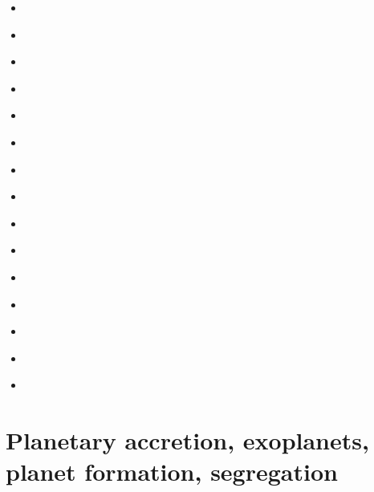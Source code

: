 \begin{scriptsize}
\begin{itemize}
\item[\nineteenninetyfive] 
\textcite{trry95}
\item[\nineteenninetynine] 
\textcite{loja99}
\item[\twothousandthree] 
\textcite{evan03}
\item[\twothousandseven] 
\textcite{zhzl07} 
\textcite{copb07} 
\textcite{phbu07}
\item[\twothousandnine] 
\textcite{zhzm09}
\textcite{onlj09}
\item[\twothousandten] 
\textcite{helo10}
\item[\twothousandeleven] 
\textcite{lemj11}
\textcite{burk11}
\textcite{helo11}
\item[\twothousandfourteen] 
\textcite{buto14} 
\textcite{helo14} 
\textcite{roct14} 
\item[\twothousandfifteen] 
\textcite{hels15} 
\item[\twothousandsixteen] 
\textcite{trlo16} 
\textcite{heps16b} 
\item[\twothousandseventeen] 
\textcite{woda17} 
\textcite{kaha17} 
\textcite{baso17} 
\item[\twothousandeighteen] 
\textcite{heps18} 
\textcite{dusr18} 
\item[\twothousandnineteen] 
\textcite{begb19} 
\textcite{wihb19} 
\textcite{huzl19} 
\textcite{panm19} 
\textcite{hall19} 
\item[\twothousandtwenty] 
\textcite{hemn20} 
\item[\twothousandtwentyone] 
\textcite{fabh21} 
\end{itemize}
\end{scriptsize}





\section{Planetary accretion, exoplanets, planet formation, segregation}

